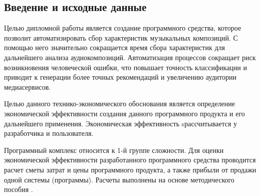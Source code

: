 \subsection{Введение и исходные данные}
\label{sec:economics:introduction}

Целью дипломной работы является создание программного средства, которое позволит автоматизировать сбор характеристик музыкальных композиций. С помощью него значительно сокращается время сбора характеристик для дальнейшего анализа аудиокомпозиций. Автоматизация процессов сокращает риск возникновения человеческой ошибки, что повышает точность классификации и приводит к генерации более точных рекомендаций и увеличению аудитории медиасервисов.

Целью данного технико-экономического обоснования является определение экономической эффективности создания данного программного \linebreak продукта и его дальнейшего применения. Экономическая эффективность \linebreak sрассчитывается у разработчика и пользователя.

Программный комплекс относится к 1-й группе сложности. Для оценки экономической эффективности разработанного программного средства проводится расчет сметы затрат и цены программного продукта, а также прибыли от продажи одной системы (программы). Расчеты выполнены на основе методического пособия \cite{palitsyn}.
